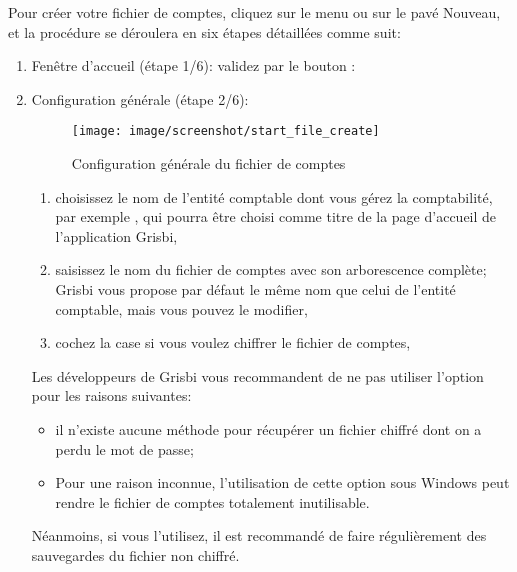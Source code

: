 Pour créer votre fichier de comptes, cliquez sur le menu  ou sur le pavé Nouveau, et la procédure se déroulera en six étapes détaillées comme suit:

\begin{enumerate}
	\item Fenêtre d'accueil (étape 1/6): validez par le bouton :
	\item Configuration générale (étape 2/6):

\begin{figure}[htbp]
	\begin{center}
		\texttt{[image: image/screenshot/start\_file\_create]}
	\end{center}
	\caption{Configuration générale du fichier de comptes}
	\label{start_file_create}
\end{figure}
		
		\begin{enumerate}
		 	\item choisissez le nom de l'entité comptable dont vous gérez la comptabilité, par exemple , qui pourra être choisi comme titre de la page d'accueil de l'application Grisbi,
			\item saisissez le nom du fichier de comptes avec son arborescence complète; Grisbi vous propose par défaut le même nom que celui de l'entité comptable, mais vous pouvez le modifier,
			\item cochez la case  si vous voulez \gls{chiffrer} le fichier de comptes,
			
		\end{enumerate}

Les développeurs de Grisbi vous recommandent de ne pas utiliser l'option  pour les raisons suivantes: 
\begin{itemize}
	\item il n’existe aucune méthode pour récupérer un fichier chiffré dont on a perdu le mot de passe;
	\item Pour une raison inconnue, l’utilisation de cette option sous Windows peut rendre le fichier de comptes totalement inutilisable.
\end{itemize}  
Néanmoins, si vous l'utilisez, il est recommandé de faire régulièrement des sauvegardes du fichier non chiffré.			


\end{enumerate}
